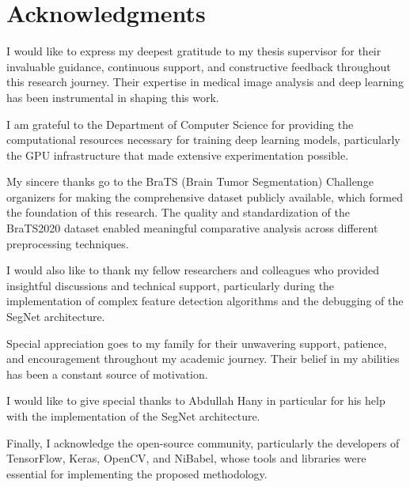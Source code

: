 \chapter*{Acknowledgments}
I would like to express my deepest gratitude to my thesis supervisor for their invaluable guidance, continuous support, and constructive feedback throughout this research journey. Their expertise in medical image analysis and deep learning has been instrumental in shaping this work.

I am grateful to the Department of Computer Science for providing the computational resources necessary for training deep learning models, particularly the GPU infrastructure that made extensive experimentation possible.

My sincere thanks go to the BraTS (Brain Tumor Segmentation) Challenge organizers for making the comprehensive dataset publicly available, which formed the foundation of this research. The quality and standardization of the BraTS2020 dataset enabled meaningful comparative analysis across different preprocessing techniques.

I would also like to thank my fellow researchers and colleagues who provided insightful discussions and technical support, particularly during the implementation of complex feature detection algorithms and the debugging of the SegNet architecture.

Special appreciation goes to my family for their unwavering support, patience, and encouragement throughout my academic journey. Their belief in my abilities has been a constant source of motivation.

I would like to give special thanks to Abdullah Hany in particular for his help with the implementation of the SegNet architecture.

Finally, I acknowledge the open-source community, particularly the developers of TensorFlow, Keras, OpenCV, and NiBabel, whose tools and libraries were essential for implementing the proposed methodology.